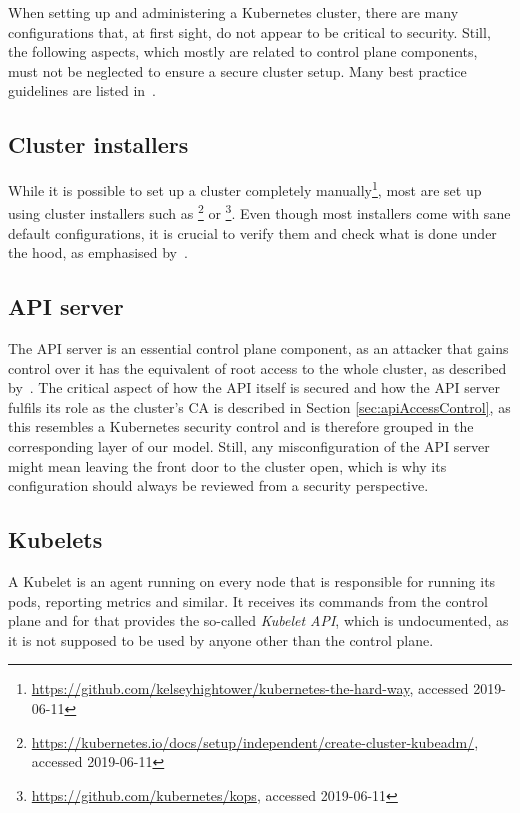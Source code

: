 When setting up and administering a Kubernetes cluster, there are many configurations that, at first sight, do not appear to be critical to security. Still, the following aspects, which mostly are related to control plane components, must not be neglected to ensure a secure cluster setup. Many best practice guidelines are listed in~\textcite{kubernetessecurity}.

\subsection{Cluster installers}

While it is possible to set up a cluster completely manually\footnote{\url{https://github.com/kelseyhightower/kubernetes-the-hard-way}, accessed 2019-06-11}, most are set up using cluster installers such as \footnote{\url{https://kubernetes.io/docs/setup/independent/create-cluster-kubeadm/}, accessed 2019-06-11} or \footnote{\url{https://github.com/kubernetes/kops}, accessed 2019-06-11}. Even though most installers come with sane default configurations, it is crucial to verify them and check what is done under the hood, as emphasised by~\textcite{securingkubernetesConfK8SClusterComponents}. 

\subsection{API server}

The API server is an essential control plane component, as an attacker that gains control over it has the equivalent of root access to the whole cluster, as described by~\cite{kubernetessecurity}. The critical aspect of how the API itself is secured and how the API server fulfils its role as the cluster's \ac{CA} is described in Section \ref{sec:apiAccessControl}, as this resembles a Kubernetes security control and is therefore grouped in the corresponding layer of our model. Still, any misconfiguration of the API server might mean leaving the front door to the cluster open, which is why its configuration should always be reviewed from a security perspective.

\subsection{Kubelets}

A Kubelet is an agent running on every node that is responsible for running its pods, reporting metrics and similar. It receives its commands from the control plane and for that provides the so-called \textit{Kubelet API}, which is undocumented, as it is not supposed to be used by anyone other than the control plane. 

